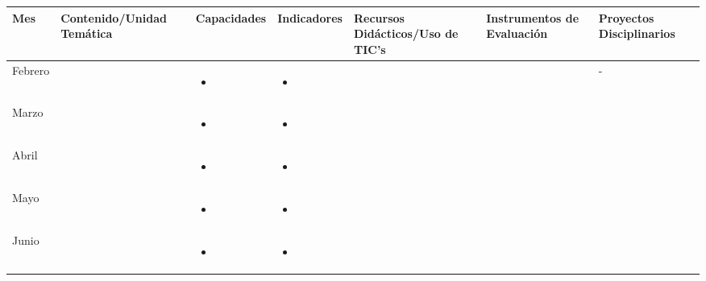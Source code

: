 \documentclass[landscape, a4paper, 10pt]{article}
\newcommand{\smallcellwidth}{0.7in}
\newcommand{\normalcellwidth}{1.2in}
\newcommand{\bigcellwidth}{2.0in}
\begin{document}
	\begin{longtable}{|m{\smallcellwidth}|p{\normalcellwidth}|p{\bigcellwidth}|p{\bigcellwidth}|p{\normalcellwidth}|p{\normalcellwidth}|p{\normalcellwidth}|}
		\hline
		\textbf{Mes} &
		\textbf{Contenido/Unidad Temática} &
		\textbf{Capacidades} &
		\textbf{Indicadores} &
		\textbf{Recursos Didácticos/Uso de TIC's} &
		\textbf{Instrumentos de Evaluación} &
		\textbf{Proyectos Disciplinarios} \\
		\hline
		\endhead
		Febrero &
		 &
		\begin{itemize}
			\item 
		\end{itemize} &
		\begin{itemize}
			\item 
		\end{itemize} &
		 &
		 &
		 - \\
		\hline
		Marzo &
		 &
		\begin{itemize}
			\item 
		\end{itemize} &
		\begin{itemize}
			\item 
		\end{itemize} &
		 &
		 &
		 \\
		\hline
		Abril &
		 &
		\begin{itemize}
			\item 
		\end{itemize} &
		\begin{itemize}
			\item 
 		\end{itemize} &
 		 &
		 &
		 \\
		\hline
		Mayo &
		 &
		\begin{itemize}
			\item 
		\end{itemize} &
		\begin{itemize}
			\item 
 		\end{itemize} &
		 &
		 &
		 \\
		\hline
		Junio &
		 &
		\begin{itemize}
			\item 
		\end{itemize} &
		\begin{itemize}
			\item 

\end{itemize}
\end{longtable}
\end{document}
